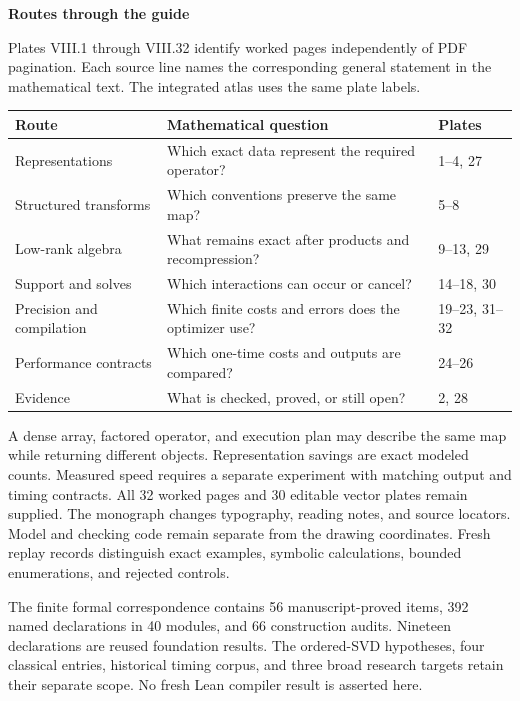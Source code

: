 {\sffamily\bfseries\Large\color{accent}Routes through the guide\par}\vspace{12pt}
Plates VIII.1 through VIII.32 identify worked pages independently of PDF pagination. Each source line names the corresponding general statement in the mathematical text. The integrated atlas uses the same plate labels.
\begin{center}\small
\begin{tabularx}{\linewidth}{@{}p{1.55in}Yl@{}}\toprule
Route & Mathematical question & Plates\\\midrule
Representations & Which exact data represent the required operator? & 1--4, 27\\
Structured transforms & Which conventions preserve the same map? & 5--8\\
Low-rank algebra & What remains exact after products and recompression? & 9--13, 29\\
Support and solves & Which interactions can occur or cancel? & 14--18, 30\\
Precision and compilation & Which finite costs and errors does the optimizer use? & 19--23, 31--32\\
Performance contracts & Which one-time costs and outputs are compared? & 24--26\\
Evidence & What is checked, proved, or still open? & 2, 28\\\bottomrule
\end{tabularx}
\end{center}
A dense array, factored operator, and execution plan may describe the same map while returning different objects. Representation savings are exact modeled counts. Measured speed requires a separate experiment with matching output and timing contracts.
All 32 worked pages and 30 editable vector plates remain supplied. The monograph changes typography, reading notes, and source locators. Model and checking code remain separate from the drawing coordinates. Fresh replay records distinguish exact examples, symbolic calculations, bounded enumerations, and rejected controls.

The finite formal correspondence contains 56 manuscript-proved items, 392 named declarations in 40 modules, and 66 construction audits. Nineteen declarations are reused foundation results. The ordered-SVD hypotheses, four classical entries, historical timing corpus, and three broad research targets retain their separate scope. No fresh Lean compiler result is asserted here.
